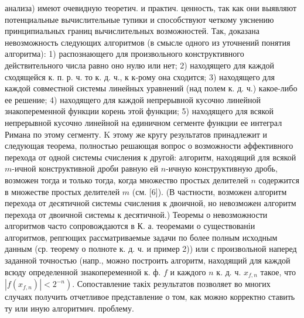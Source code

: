 \documentclass[10pt]{article}
\begin{document}
анализа) имеют очевидную теоретич. и практич. ценность, так как они выявляют потенциальные вычислительные тупики и способствуют четкому уяснению принципиальных границ вычислительных возможностей. Так, доказана невозможность следующих алгоритмов (в смысле одного из уточнений понятия алгоритма): 1) распознающего для произвольного конструктивного действительного числа равно оно нулю или нет; 2) находящего для каждой сходящейся к. п. р. ч. то к. д. ч., к к-рому она сходится; 3) находящего для каждой совместной системы линейных уравнений (над полем к. д. ч.) какое-либо ее решение; 4) находящего для каждой непрерывной кусочно линейной знакопеременной функции корень этой функции; 5) находящего для всякой непрерывной кусочно линейной на единичном сегменте функции ее интеграл Римана по этому сегменту. $\mathrm{K}$ этому же кругу результатов принадлежит и следующая теорема, полностью решающая вопрос о возможности әффективного перехода от одной системы счисления к другой: алгоритм, находящий для всякой $m$-ичной конструктивной дроби равную ей $n$-ичную конструктивную дробь, возможен тогда и только тогда, когда множество простых делителей $n$ содержится в множестве простых делителей $m$ (см. [6]). (В частности, возможен алгоритм перехода от десятичной системы счисления к двоичной, но невозможен алгоритм перехода от двоичной системы к десятичной.) Теоремы о невозможности алгоритмов часто сопровождаются в $К$. а. теоремами о существованіи алгоритмов, репгющих рассматриваемые задачи по более полным исходным данным (ср. теорему о полноте к. д. ч. и пример 2)) или с произвольной наперед заданной точностью (напр., можно построить алгоритм, находящий для каждой всюду определенной знакопеременной к. ф. $f$ и каждого $n$ к. д. ч. $x_{f, n}$ такое, что $\left.\left|f\left(x_{f, n}\right)\right|<2^{-n}\right)$. Сопоставление такіх результатов позволяет во многих случаях получить отчетливое представление о том, как можно корректно ставить ту или иную алгоритмич. проблему.
\end{document}
